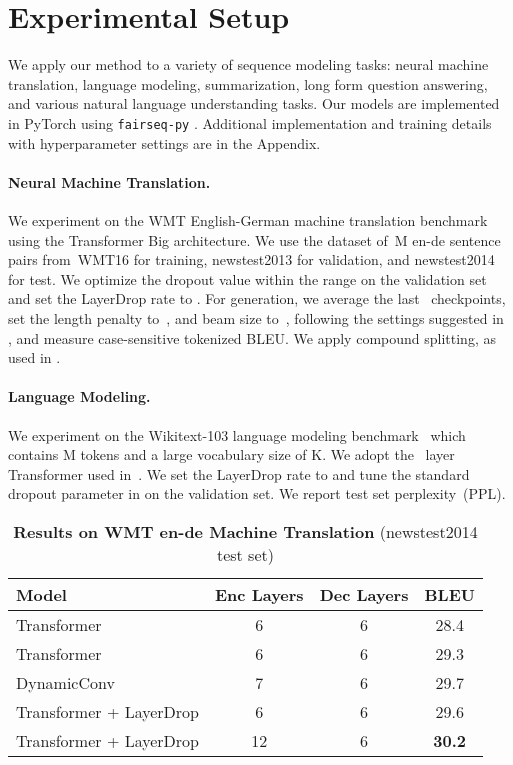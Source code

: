 \section{Experimental Setup}

We apply our method to a variety of sequence modeling tasks: neural machine translation, language modeling, summarization, long form question answering, and various natural language understanding tasks.
Our models are implemented in PyTorch using \texttt{fairseq-py} \citep{ott2019fairseq}. Additional implementation and training details with hyperparameter settings are in the Appendix.

\paragraph{Neural Machine Translation.}

We experiment on the WMT English-German machine translation benchmark using the Transformer Big architecture. We use the dataset of~M en-de sentence pairs from~WMT16 \citep{vaswani2017attention} for training, newstest2013 for validation, and newstest2014 for test. We optimize the dropout value within the range  on the validation set and set the LayerDrop rate  to .
For generation, we average the last~ checkpoints, set the length penalty to~, and beam size to~, following the settings suggested in \cite{wu2018pay}, and measure case-sensitive tokenized BLEU. We apply compound splitting, as used in \cite{vaswani2017attention}.

\paragraph{Language Modeling.}

We experiment on the Wikitext-103 language modeling benchmark~\citep{merity2016wikitext} which contains M tokens and a large vocabulary size of K.
We adopt the~ layer Transformer used in~\citet{baevski2018adaptive}. We set the LayerDrop rate  to  and tune the standard dropout parameter in  on the validation set.
We report test set perplexity~(PPL).

\begin{table}[t]
    \centering
    \begin{tabular}{lccc}
      \toprule
        Model & Enc Layers & Dec Layers & BLEU  \\
        \midrule
Transformer \citep{vaswani2017attention} & 6 & 6 & 28.4 \\
        Transformer \citep{ott2018scaling} & 6 & 6 & 29.3 \\
        DynamicConv \citep{wu2018pay} & 7 & 6 & 29.7 \\
        \midrule
        Transformer \citep{ott2018scaling} + LayerDrop & 6 & 6 & 29.6 \\
        Transformer \citep{ott2018scaling} + LayerDrop & 12 & 6 & \textbf{30.2}\\
        \bottomrule
    \end{tabular}
        \caption{\textbf{Results on WMT en-de Machine Translation} (newstest2014 test set)}
        \label{tab:nmt_ende}
\end{table}

